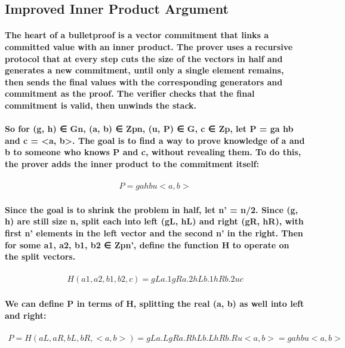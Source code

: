 \documentclass{article}
\begin{document}
\subsection{Improved Inner Product Argument}

\paragraph{The heart of a bulletproof is a vector commitment that links a committed value with an inner product.  The prover uses a recursive protocol that at every step cuts the size of the vectors in half and generates a new commitment, until only a single element remains, then sends the final values with the corresponding generators and commitment as the proof.  The verifier checks that the final commitment is valid, then unwinds the stack.}

\paragraph{So for (g, h) ∈ Gn, (a, b) ∈ Zpn, (u, P) ∈ G, c ∈ Zp, let P = ga hb and c = <a, b>.  The goal is to find a way to prove knowledge of a and b to someone who knows P and c, without revealing them.  To do this, the prover adds the inner product to the commitment itself:}

\begin{eqnarray}
  P = ga hb u<a, b>
\end{eqnarray}

\paragraph{Since the goal is to shrink the problem in half, let n’ = n/2.  Since (g, h) are still size n, split each into left (gL, hL) and right (gR, hR), with first n’ elements in the left vector and the second n’ in the right.  Then for some a1, a2, b1, b2 ∈ Zpn’, define the function H to operate on the split vectors. }

\begin{eqnarray}
  H(a1, a2, b1, b2, c) = gLa.1 gRa.2 hLb.1 hRb.2 uc
\end{eqnarray}

\paragraph{We can define P in terms of H, splitting the real (a, b) as well into left and right:}

\begin{eqnarray}
  P = H(aL, aR, bL, bR, <a, b>) = gLa.L gRa.R hLb.L hRb.R u<a, b> = ga hb u<a, b>
\end{eqnarray}
\end{document}
